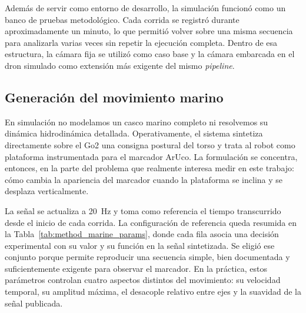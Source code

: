\documentclass[12pt,a4paper]{report}
\begin{document}
Además de servir como entorno de desarrollo, la simulación funcionó como un
banco de pruebas metodológico. Cada corrida se registró durante aproximadamente
un minuto, lo que permitió volver sobre una misma secuencia para analizarla
varias veces sin repetir la ejecución completa. Dentro de esa estructura, la
cámara fija se utilizó como caso base y la cámara embarcada en el dron simulado
como extensión más exigente del mismo \textit{pipeline}.

\subsection{Generación del movimiento marino}

En simulación no modelamos un casco marino completo ni resolvemos su dinámica
hidrodinámica detallada. Operativamente, el sistema sintetiza directamente
sobre el Go2 una consigna postural del torso y trata al robot como plataforma
instrumentada para el marcador ArUco. La formulación se concentra, entonces, en
la parte del problema que realmente interesa medir en este trabajo: cómo cambia
la apariencia del marcador cuando la plataforma se inclina y se desplaza
verticalmente.

La señal se actualiza a \mbox{20 Hz} y toma como referencia el tiempo
transcurrido desde el inicio de cada corrida. La configuración de referencia
queda resumida en la Tabla~\ref{tab:method_marine_params}, donde cada fila
asocia una decisión experimental con su valor y su función en la señal
sintetizada. Se eligió ese conjunto porque permite reproducir una secuencia
simple, bien documentada y suficientemente exigente para observar el marcador.
En la práctica, estos parámetros controlan cuatro aspectos distintos del
movimiento: su velocidad temporal, su amplitud máxima, el desacople relativo
entre ejes y la suavidad de la señal publicada.
\end{document}
